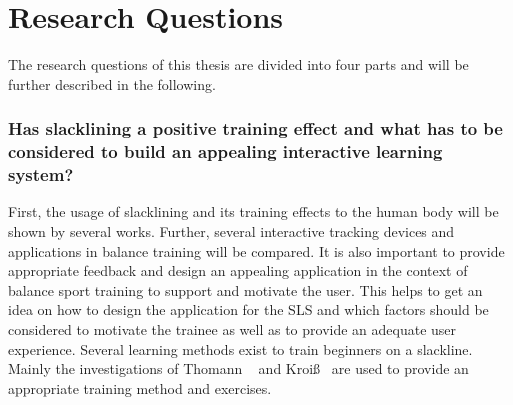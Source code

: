 \section{Research Questions}\label{1_2_researchGoals}
\begin{comment}
The research questions of this thesis are divided into four parts. 
First, the exploration of slackline training and the design of interactive tracking technologies.
Second, the conceptual design of the actual interactive slackline learning system, further called \textit{SLS}.
Third, implementation details of the system from the view point of an developer.
Lastly the investigation of the SLS with slackline beginners in a user study to investigate if a positive learning effect can be achieved and if it can compete against a common learning method.
These parts are further described in the following.
\end{comment}
The research questions of this thesis are divided into four parts and will be further described in the following.

\subsubsection{Has slacklining a positive training effect and what has to be considered to build an appealing interactive learning system?}\label{rq_slacklineTrainingSystem}
First, the usage of slacklining and its training effects to the human body will be shown by several works.
Further, several interactive tracking devices and applications in balance training will be compared.
It is also important to provide appropriate feedback and design an appealing application in the context of balance sport training to support and motivate the user.
This helps to get an idea on how to design the application for the SLS and which factors should be considered to motivate the trainee as well as to provide an adequate user experience.
Several learning methods exist to train beginners on a slackline.
Mainly the investigations of Thomann ~\cite{Thomann2013-aa} and Kroiß~\cite{Kroiss2007-ab} are used to provide an appropriate training method and exercises. 

